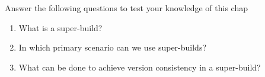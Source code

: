 Answer the following questions to test your knowledge of this chap

\begin{enumerate}
\item 
What is a super-build?

\item 
In which primary scenario can we use super-builds?

\item 
What can be done to achieve version consistency in a super-build?
\end{enumerate}